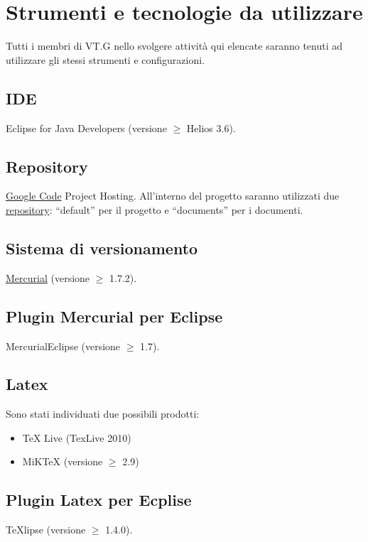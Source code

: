 \chapter{Strumenti e tecnologie da utilizzare}
\thispagestyle{fancy}
Tutti i membri di VT.G nello svolgere attività qui elencate saranno tenuti ad
utilizzare gli stessi strumenti e configurazioni.

\section{IDE}
Eclipse for Java Developers (versione $\geq$ Helios 3.6).
 
\section{Repository}
\underline{Google Code} Project Hosting.
All'interno del progetto saranno utilizzati due \underline{repository}: ``default''
per il progetto e ``documents'' per i documenti.

\section{Sistema di versionamento}
\underline{Mercurial}  (versione $\geq$ 1.7.2).

\section{Plugin Mercurial per Eclipse}
MercurialEclipse (versione $\geq$ 1.7).

% 

\section{Latex}
Sono stati individuati due possibili prodotti:
\begin{itemize}
  \item TeX Live (TexLive 2010)
  \item MiKTeX (versione $\geq$ 2.9)
\end{itemize}

\section{Plugin Latex per Ecplise}
TeXlipse (versione $\geq$ 1.4.0).

